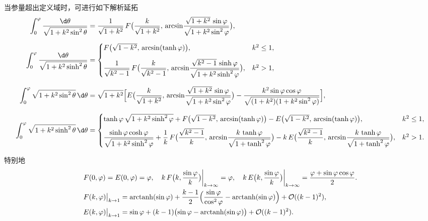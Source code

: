 当参量超出定义域时，可进行如下解析延拓
\small
\begin{align*}
	\int_{0}^{\varphi}\dfrac{\d \theta}{\sqrt{1 + k^2\sin^2\theta}}
	 & =\dfrac{1}{\sqrt{1+k^2}}\,
	F\bigl(\dfrac{k}{\sqrt{1+k^2}},\,
	\arcsin\!\dfrac{\sqrt{1+k^2}\,\sin\varphi}{\sqrt{1+k^2\sin^2\varphi}}\bigr),                                                       \\[6pt]
	\int_{0}^{\varphi}\dfrac{\d \theta}{\sqrt{1 + k^2\sinh^2\theta}}
	 & =
	\begin{cases}
		F\bigl(\sqrt{1-k^2},\,\arcsin(\tanh\varphi)\bigr),                             & k^2\le1, \\[2ex]
		\dfrac{1}{\sqrt{k^2-1}}\,
		F\bigl(\dfrac{k}{\sqrt{k^2-1}},\,
		\arcsin\!\dfrac{\sqrt{k^2-1}\,\sinh\varphi}{\sqrt{1+k^2\sinh^2\varphi}}\bigr), & k^2>1,
	\end{cases} \\[8pt]
	\int_{0}^{\varphi}\sqrt{1 + k^2\sin^2\theta}\,\d \theta
	 & =\sqrt{1+k^2}\Bigl[
		E\bigl(\dfrac{k}{\sqrt{1+k^2}},\,
		\arcsin\!\dfrac{\sqrt{1+k^2}\,\sin\varphi}{\sqrt{1+k^2\sin^2\varphi}}\bigr)
	-\dfrac{k^2\sin\varphi\cos\varphi}{\sqrt{(1+k^2)(1+k^2\sin^2\varphi)}}\Bigr],                                                      \\[8pt]
	\int_{0}^{\varphi}\sqrt{1 + k^2\sinh^2\theta}\,\d \theta
	 & =
	\begin{cases}
		\tanh\varphi\,\sqrt{1+k^2\sinh^2\varphi}
		+F\bigl(\sqrt{1-k^2},\,\arcsin(\tanh\varphi)\bigr)
		-E\bigl(\sqrt{1-k^2},\,\arcsin(\tanh\varphi)\bigr),              & k^2\le1, \\[6pt]
		\dfrac{\sinh\varphi\cosh\varphi}{\sqrt{1+k^2\sinh^2\varphi}}
		+\dfrac{1}{k}\,
		F\bigl(\dfrac{\sqrt{k^2-1}}{k},\,
		\arcsin\!\dfrac{k\,\tanh\varphi}{\sqrt{1+\tanh^2\varphi}}\bigr)
		-k\,
		E\bigl(\dfrac{\sqrt{k^2-1}}{k},\,
		\arcsin\!\dfrac{k\,\tanh\varphi}{\sqrt{1+\tanh^2\varphi}}\bigr), & k^2>1.
	\end{cases}
\end{align*}

\normalsize
特别地
\small
\begin{align*}
	F & (0,\varphi)=E(0,\varphi)=\varphi,\quad k\,F\bigl(k,\frac{\sin\varphi}{k}\bigr)\bigg|_{k\to\infty}=\varphi,\quad
	k\,E\bigl(k,\frac{\sin\varphi}{k}\bigr)\bigg|_{k\to\infty}
	=\frac{\varphi+\sin\varphi\cos\varphi}{2}.                                                                          \\
	F & (k,\varphi)\big|_{k\to1}
	=\operatorname{arctanh}(\sin\varphi)
	+\frac{k-1}{2}\Bigl(\frac{\sin\varphi}{\cos^2\varphi}-\operatorname{arctanh}(\sin\varphi)\Bigr)
	+\mathcal{O}((k-1)^2),                                                                                              \\
	E & (k,\varphi)\big|_{k\to1}
	=\sin\varphi+(k-1)\bigl(\sin\varphi-\operatorname{arctanh}(\sin\varphi)\bigr)
	+\mathcal{O}((k-1)^2).
\end{align*}
\normalsize


